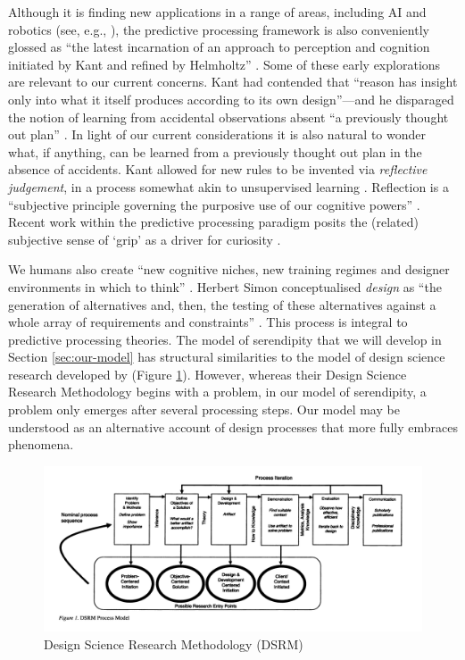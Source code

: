 Although it is finding new applications in a range of areas, including AI and robotics (see, e.g., \citet{DBLP:journals/corr/McGregorBB15,10.3389/frobt.2018.00021,thornton2017predictive}), the predictive processing framework is also conveniently glossed as ``the latest incarnation of an approach to perception and cognition initiated by Kant and refined by Helmholtz'' \cite{swanson2016predictive}.  Some of these early explorations are relevant to our current concerns.  Kant had contended that ``reason has insight only into what it itself produces according to its own design''---and he disparaged the notion of learning from accidental observations absent ``a previously thought out plan'' \cite[p.~20]{kant1929critique}.  In light of our current considerations it is also natural to wonder what, if anything, can be learned from a previously thought out plan in the absence of accidents.  Kant allowed for new rules to be invented via \emph{reflective judgement}, in a process somewhat akin to unsupervised learning \cite[p.~265]{kant1987critique}.  Reflection is a ``subjective principle governing the purposive use of our cognitive powers'' \cite[p.~266]{kant1987critique}.  Recent work within the predictive processing paradigm posits the (related) subjective sense of `grip' as a driver for curiosity \cite{Kiverstein2017}.

We humans also create ``new cognitive niches, new training regimes and designer environments in which to think'' \cite[p.~265]{pittphilsci10470}.  
Herbert Simon  conceptualised \emph{design} as ``the generation of alternatives and, then, the testing of these alternatives against a whole array of requirements and constraints'' \cite[pp.~128--129]{simon1996sciences}. This process is integral to predictive processing theories. 
The model of serendipity that we will develop in Section \ref{sec:our-model} has structural similarities to the model of design science research developed by \citet{Peffers:2007:DSR:1481765.1481768} (Figure \ref{fig:dsrm}).  However, whereas their Design Science Research Methodology begins with a problem, in our model of serendipity, a problem only emerges after several processing steps.  Our model may be understood as an alternative account of design processes that more fully embraces phenomena.

\begin{figure}
\includegraphics[width=\textwidth,trim={0 3cm 0 0},clip]{pfeffers}
\caption{\citet[p.~54]{Peffers:2007:DSR:1481765.1481768} Design Science Research Methodology (DSRM)\label{fig:dsrm}}
\end{figure}
